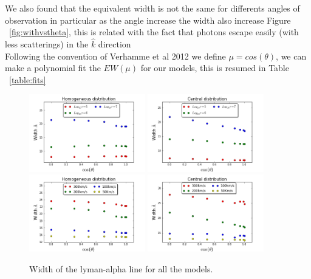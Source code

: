 \documentclass[usenatbib]{mn2e}
\begin{document}
We also found that the equivalent width is not the same for differents angles of observation in particular as the angle increase the width also increase Figure ~\ref{fig:withvstheta}, this is related with the fact that photons escape easily (with less scatterings) in the $\hat{k}$ direction\\ 
Following the convention of Verhamme et al 2012 we define $\mu=cos(\theta)$, we can make a polynomial fit the $EW(\mu)$ for our models, this is resumed in Table ~\ref{table:fits}

\begin{figure}
    \includegraphics[width=0.45\textwidth]{WidthvsThetaDifODHOM.png}
    \includegraphics[width=0.45\textwidth]{WidthvsThetaDifOD.png}
    \includegraphics[width=0.45\textwidth]{WidthvsThetaDifSpeedsHOM.png}
    \includegraphics[width=0.45\textwidth]{WidthvsThetaDifSpeeds.png}
  \label{figure:widthvstheta}\caption{Width of the lyman-alpha line for all the models. }
\end{figure}
\end{document}
